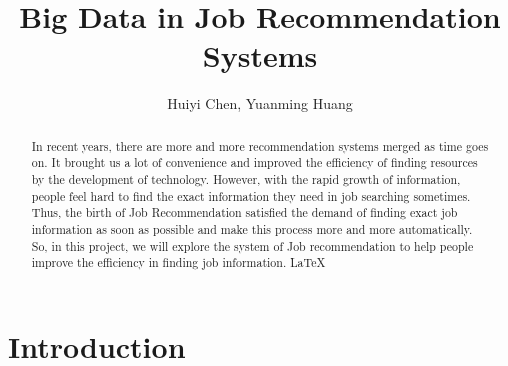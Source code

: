 \documentclass[sigconf]{acmart}
\begin{document}
\title{Big Data in Job Recommendation Systems}


\author{Huiyi Chen, Yuanming Huang}



\renewcommand{\shortauthors}{H. CHEN, Y. Huang}


\begin{abstract}
In recent years, there are more and more recommendation systems merged as time goes on. It brought us a lot of convenience and improved the efficiency of finding resources by the development of technology. However, with the rapid growth of information, people feel hard to find the exact information they need in job searching sometimes. Thus, the birth of Job Recommendation satisfied the demand of finding exact job information as soon as possible and make this process more and more automatically. So, in this project, we will explore the system of Job recommendation to help people improve the efficiency in finding job information.
\LaTeX\
\end{abstract}



\maketitle

\section{Introduction}
\end{document}

